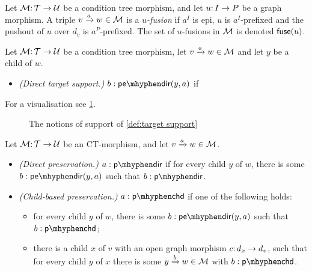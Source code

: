 \begin{definition}
Let ${\mathcal{M}}{:}\, {\mathcal{T}}\rightarrow{\mathcal{U}}$ be a condition tree morphism, and let $u{:}\, I\rightarrow P$ be a graph morphism. A triple ${v}\xrightarrow{a}{w}\in{\mathcal{M}}$ is a \emph{$u$-fusion} if $a^I$ is epi, $u$ is $a^I$-prefixed and the pushout of $u$ over $d_v$ is $a^P$-prefixed. The set of $u$-fusions in ${\mathcal{M}}$ is denoted ${\mathsf{fuse}}(u)$.
\end{definition}

\begin{definition}\label{def:target support}
Let ${\mathcal{M}}{:}\, {\mathcal{T}}\rightarrow{\mathcal{U}}$ be a condition tree morphism, let ${v}\xrightarrow{a}{w}\in{\mathcal{M}}$ and let $y$ be a child of $w$.
\begin{itemize}[topsep=\smallskipamount]
\item \emph{(Direct target support.)} $b:\tdir{y,a}$ if 
\end{itemize}
\end{definition}
%
For a visualisation see \cref{fig:target-support}.
%
\begin{figure}
	
	\caption{The notions of support of \cref{def:target support}}
	\label{fig:target-support}
\end{figure}

\begin{definition}
Let ${\mathcal{M}}{:}\, {\mathcal{T}}\rightarrow{\mathcal{U}}$ be an CT-morphism, and let ${v}\xrightarrow{a}{w}\in{\mathcal{M}}$.
\begin{itemize}[topsep=\smallskipamount]
\item \emph{(Direct preservation.)} $a:\pdir$ if for every child $y$ of $w$, there is some $b:\tdir{y,a}$ such that $b:\pdir$.
\item \emph{(Child-based preservation.)} $a:\pchd$ if one of the following holds:
\begin{itemize}
\item for every child $y$ of $w$, there is some $b:\tdir{y,a}$ such that $b:\pchd$;
\item there is a child $x$ of $v$ with an open graph morphism $c{:}\, d_x\rightarrow d_v$, such that for every child $y$ of $x$ there is some ${y}\xrightarrow{b}{w}\in{\mathcal{M}}$ with $b:\pchd$.
\end{itemize}
\end{itemize}
\end{definition}

